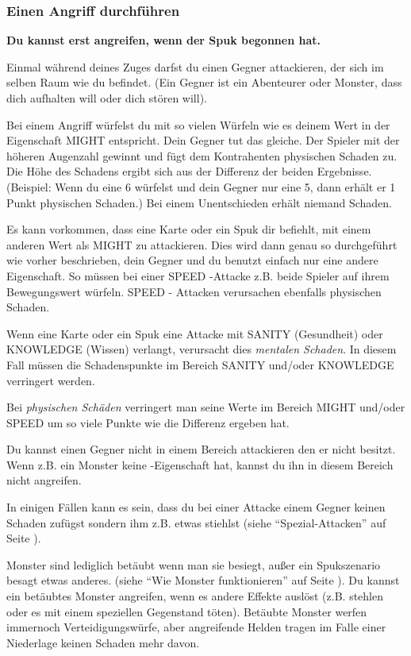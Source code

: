 \subsubsection{Einen Angriff durchführen}
\label{kap:rule:attack}

\textbf{Du kannst erst angreifen, wenn der Spuk begonnen hat.}

Einmal während deines Zuges darfst du einen Gegner attackieren, der sich im selben Raum wie du befindet.  (Ein Gegner ist ein Abenteurer oder Monster, dass dich aufhalten will oder dich stören will).

Bei einem Angriff würfelst du mit so vielen Würfeln wie es deinem Wert in der Eigenschaft MIGHT entspricht. Dein Gegner tut das gleiche. Der Spieler mit der höheren Augenzahl gewinnt und fügt dem Kontrahenten physischen Schaden zu. Die Höhe des Schadens ergibt sich aus der Differenz der beiden Ergebnisse. (Beispiel: Wenn du eine 6 würfelst und dein Gegner nur eine 5, dann erhält er 1 Punkt physischen Schaden.) Bei einem Unentschieden
erhält niemand Schaden.

Es kann vorkommen, dass eine Karte oder ein Spuk dir befiehlt, mit einem anderen Wert als MIGHT zu attackieren. Dies wird dann genau so durchgeführt wie vorher beschrieben, dein Gegner und du benutzt einfach nur eine andere Eigenschaft. So müssen bei einer SPEED -Attacke z.B. beide Spieler auf ihrem Bewegungswert würfeln. SPEED - Attacken verursachen ebenfalls physischen Schaden.

Wenn eine Karte oder ein Spuk eine Attacke mit SANITY (Gesundheit) oder KNOWLEDGE (Wissen) verlangt, verursacht dies \emph{mentalen Schaden}. In diesem Fall müssen die Schadenspunkte im Bereich SANITY und/oder KNOWLEDGE verringert werden.

Bei \emph{physischen Schäden} verringert man seine Werte im Bereich MIGHT und/oder SPEED um so viele Punkte wie die Differenz ergeben hat.

Du kannst einen Gegner nicht in einem Bereich attackieren den er nicht besitzt. Wenn z.B. ein Monster keine \sanity-Eigenschaft hat, kannst du ihn in diesem Bereich nicht angreifen.

In einigen Fällen kann es sein, dass du bei einer Attacke einem Gegner keinen Schaden zufügst sondern ihm z.B. etwas stiehlst (siehe ``Spezial-Attacken'' auf Seite \pageref{kap:rule:specialattack}).

Monster sind lediglich betäubt wenn man sie besiegt, außer ein Spukszenario besagt etwas anderes. (siehe ``Wie Monster funktionieren'' auf Seite \pageref{kap:rules:monsters}). Du kannst ein betäubtes Monster angreifen, wenn es andere Effekte auslöst (z.B. stehlen oder es mit einem speziellen Gegenstand töten). Betäubte Monster werfen immernoch Verteidigungswürfe, aber angreifende Helden tragen im Falle einer Niederlage keinen Schaden mehr davon.

